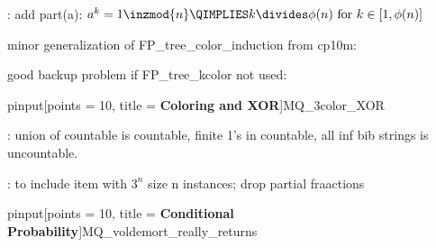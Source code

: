 \documentclass[quiz]{mcs}
\renewcommand{\examspace}[]{}
\begin{document}
\examspace
\begin{editingnotes}
: add part(a): $a^k = 1 \inzmod{n} \QIMPLIES k \divides
\phi(n)\text{ for } k \in [1,\phi(n)]$

\end{editingnotes}

\examspace
\begin{editingnotes}
minor generalization of FP\_tree\_color\_induction from cp10m:
\end{editingnotes}

\begin{editingnotes}
good backup problem if FP\_tree\_kcolor not used:

pinput[points = 10, title = \textbf{Coloring and XOR}]{MQ\_3color\_XOR}
\end{editingnotes}

\examspace
\begin{editingnotes}
:
union of countable is countable, finite 1's in countable, all inf bib
strings is uncountable.
\end{editingnotes}


\examspace
{}

\examspace
\begin{editingnotes}
: to include item with $3^n$ size n instances; drop partial fraactions
\end{editingnotes}

\examspace
{}

\examspace
{}

\begin{editingnotes}
pinput[points = 10, title = \textbf{Conditional Probability}]{MQ\_voldemort\_really\_returns}
\end{editingnotes}

\examspace
{}
\end{document}
